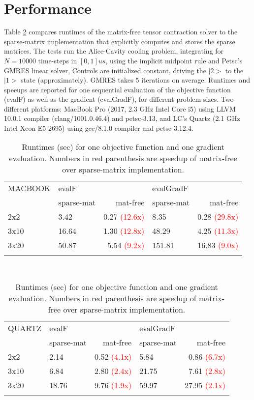 \documentclass[letterpaper]{article}
\begin{document}
\section{Performance}
Table \ref{tab:runtime_qvsm} compares runtimes of the matrix-free tensor
contraction solver to the sparse-matrix implementation that explicitly computes
and stores the sparse matrices. The tests run the Alice-Cavity cooling problem,
integrating for $N=10000$ time-steps in $[0,1]us$, using the implicit midpoint
rule and Petsc's GMRES linear solver, Controls are initialized constant, driving
the $|2>$ to the $|1>$ state (approximately). GMRES takes $5$ iterations on
average. 
Runtimes and speeups are reported for one sequential evaluation of the objective
function (evalF) as well as the gradient (evalGradF), for different problem
sizes. Two different platforms: MacBook Pro (2017, 2.3 GHz Intel Core i5) using
LLVM 10.0.1 compiler (clang/1001.0.46.4) and petsc-3.13, and LC's Quartz (2.1
GHz Intel Xeon E5-2695) using gcc/8.1.0 compiler and petsc-3.12.4.

\begin{table}[h]
  \begin{tabular}{l|lr|lr}
    \hline\noalign{\smallskip}
     MACBOOK    & evalF &    &  evalGradF &\\
                & sparse-mat & mat-free & sparse-mat& mat-free  \\
    \noalign{\smallskip}\hline\noalign{\smallskip}
    2x2  & 3.42   & 0.27 \textcolor{red}{(12.6x)}  & 8.35  &  0.28 \textcolor{red}{(29.8x)}  \\
    3x10 & 16.64  & 1.30  \textcolor{red}{(12.8x)} & 48.29 &  4.25 \textcolor{red}{(11.3x)}  \\
    3x20 &  50.87 & 5.54  \textcolor{red}{(9.2x)}  & 151.81 & 16.83 \textcolor{red}{ (9.0x)} \\
    \noalign{\smallskip}\hline
  \end{tabular}\\[2ex]
  \begin{tabular}{l|lr|lr}
    \hline\noalign{\smallskip}
     QUARTZ  & evalF &    &  evalGradF & \\
            & sparse-mat & mat-free & sparse-mat& mat-free  \\
    \noalign{\smallskip}\hline\noalign{\smallskip}
    2x2  &  2.14 & 0.52  \textcolor{red}{ (4.1x)} &  5.84 & 0.86 \textcolor{red}{ (6.7x)}  \\
    3x10 &  6.84 & 2.80  \textcolor{red}{ (2.4x)} & 21.75 & 7.61 \textcolor{red}{(2.8x)}   \\
    3x20 & 18.76 & 9.76  \textcolor{red}{(1.9x)}  & 59.97 & 27.95 \textcolor{red}{(2.1x)}  \\
    \noalign{\smallskip}\hline
  \end{tabular}
  \caption{Runtimes (sec) for one objective function and one gradient
  evaluation. Numbers in red parenthesis are speedup of matrix-free over
  sparse-matrix implementation.}
  \label{tab:runtime_qvsm} 
\end{table}
\end{document}
